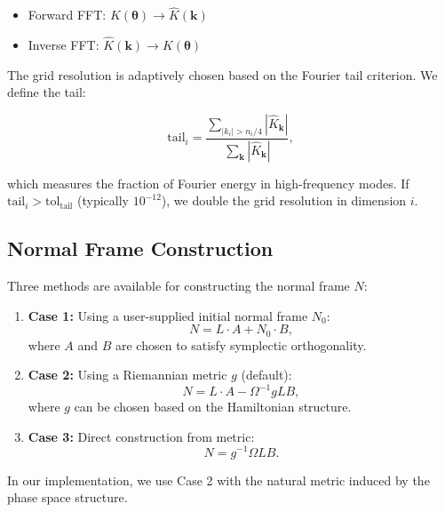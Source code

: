 \documentclass[review,onefignum,onetabnum]{siamart220329}
\begin{document}
\begin{itemize}
    \item Forward FFT: $K(\boldsymbol{\theta}) \to \hat{K}(\mathbf{k})$
    \item Inverse FFT: $\hat{K}(\mathbf{k}) \to K(\boldsymbol{\theta})$
\end{itemize}

The grid resolution is adaptively chosen based on the Fourier tail criterion.
We define the tail:

\begin{equation}
\text{tail}_i = \frac{\sum_{|k_i| > n_i/4} |\hat{K}_{\mathbf{k}}|}
                     {\sum_{\mathbf{k}} |\hat{K}_{\mathbf{k}}|},
\end{equation}

which measures the fraction of Fourier energy in high-frequency modes. If
$\text{tail}_i > \text{tol}_{\text{tail}}$ (typically $10^{-12}$), we double
the grid resolution in dimension $i$.

\subsection{Normal Frame Construction}

Three methods are available for constructing the normal frame $N$:

\begin{enumerate}
    \item \textbf{Case 1:} Using a user-supplied initial normal frame $N_0$:
    \begin{equation}
    N = L \cdot A + N_0 \cdot B,
    \end{equation}
    where $A$ and $B$ are chosen to satisfy symplectic orthogonality.

    \item \textbf{Case 2:} Using a Riemannian metric $g$ (default):
    \begin{equation}
    N = L \cdot A - \Omega^{-1} g L B,
    \end{equation}
    where $g$ can be chosen based on the Hamiltonian structure.

    \item \textbf{Case 3:} Direct construction from metric:
    \begin{equation}
    N = g^{-1} \Omega L B.
    \end{equation}
\end{enumerate}

In our implementation, we use Case 2 with the natural metric induced by the
phase space structure.
\end{document}
